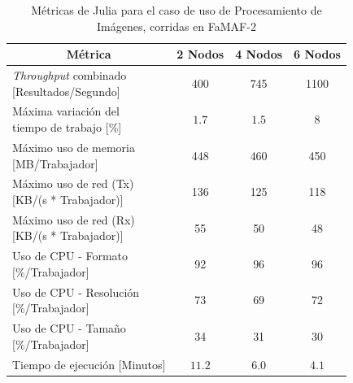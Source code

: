 \documentclass[11pt]{article}
\providecommand{\row}[1]{\parbox{150pt}{\setlength{\baselineskip}{0.2\baselineskip}\strut#1\strut}}
\newcommand{\ipcap}[2]{\caption{Métricas de #1 para el caso de uso de Procesamiento de Imágenes, corridas en #2}}
\newcommand{\english}[1]{\textit{#1}}
\begin{document}
\begin{table}[H]
\centering
\begin{tabular}{|l|c|c|c|}
\hline
\multicolumn{1}{|c|}{Métrica} & 2 Nodos & 4 Nodos & 6 Nodos \\ \hline
\row{\english{Throughput} combinado\\{[Resultados/Segundo]}} & 400 & 745 & 1100 \\ \hline
\row{Máxima variación del \\ tiempo de trabajo {[}\%{]}} & $1.7$ & $1.5$ & 8 \\ \hline
\row{Máximo uso de memoria \\ {[MB/Trabajador]}} & 448 & 460 & 450 \\ \hline
\row{Máximo uso de red (Tx) \\ {[KB/(s * Trabajador)]}} & 136 & 125 & 118 \\ \hline
\row{Máximo uso de red (Rx) \\ {[KB/(s * Trabajador)]}} & 55 & 50 & 48 \\ \hline
\row{Uso de CPU - Formato\\{[\%/Trabajador]}} & 92 & 96 & 96 \\ \hline
\row{Uso de CPU - Resolución\\{[\%/Trabajador]}} & 73 & 69 & 72 \\ \hline
\row{Uso de CPU - Tamaño\\{[\%/Trabajador]}} & 34 & 31 & 30 \\ \hline
Tiempo de ejecución [Minutos] & $11.2$ & $6.0$ & $4.1$ \\ \hline
\end{tabular}
\ipcap{Julia}{FaMAF-2}
\end{table}
\end{document}
